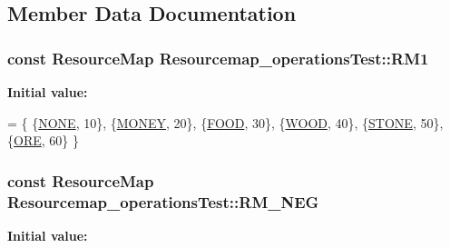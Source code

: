 \subsection{Member Data Documentation}
\hypertarget{classResourcemap__operationsTest_af1d531cadb8220f6477ab17b3a47f290}{
\subsubsection[{R\-M1}]{\setlength{\rightskip}{0pt plus 5cm}const {\bf Resource\-Map} Resourcemap\-\_\-operations\-Test\-::\-R\-M1\hspace{0.3cm}{\ttfamily [private]}}}\label{classResourcemap__operationsTest_af1d531cadb8220f6477ab17b3a47f290}
{\bfseries Initial value\-:}
\begin{DoxyCode}
= \{
        \{\hyperlink{namespaceCourse_a02d49c04029594d4adba79b84bb85f65ae3def61eb1a9033cc0b0d1d2c3c6ff84}{NONE}, 10\},
        \{\hyperlink{namespaceCourse_a02d49c04029594d4adba79b84bb85f65aff016add6bbbdbb44abf1d2d7f215ec0}{MONEY}, 20\},
        \{\hyperlink{namespaceCourse_a02d49c04029594d4adba79b84bb85f65a7018c47af38bfc1390a89e70b4cf4760}{FOOD}, 30\},
        \{\hyperlink{namespaceCourse_a02d49c04029594d4adba79b84bb85f65a87287be3009253b983ffb2e9f91eef22}{WOOD}, 40\},
        \{\hyperlink{namespaceCourse_a02d49c04029594d4adba79b84bb85f65a8598c3079c2be7785410e724cc190229}{STONE}, 50\},
        \{\hyperlink{namespaceCourse_a02d49c04029594d4adba79b84bb85f65af416a215c7dad21349df38d35be0a1e1}{ORE}, 60\}
    \}
\end{DoxyCode}
\hypertarget{classResourcemap__operationsTest_a20ba98848d1f7408a545cd740c58e57b}{
\subsubsection[{R\-M\-\_\-\-N\-E\-G}]{\setlength{\rightskip}{0pt plus 5cm}const {\bf Resource\-Map} Resourcemap\-\_\-operations\-Test\-::\-R\-M\-\_\-\-N\-E\-G\hspace{0.3cm}{\ttfamily [private]}}}\label{classResourcemap__operationsTest_a20ba98848d1f7408a545cd740c58e57b}
{\bfseries Initial value\-:}
